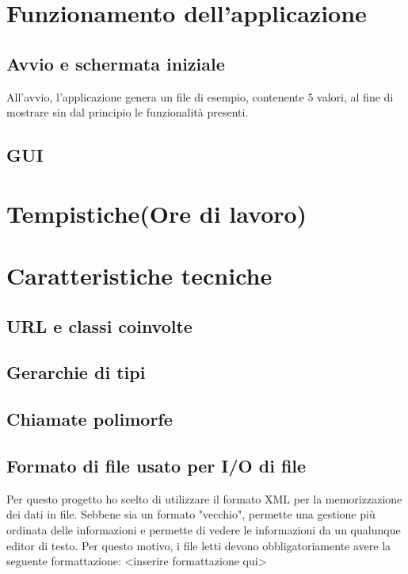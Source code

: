 \documentclass[10pt]{article}
\begin{document}
    \section{Funzionamento dell'applicazione}
    \subsection{Avvio e schermata iniziale}
    All'avvio, l'applicazione genera un file di esempio, contenente 5 valori, al fine di mostrare sin dal principio le funzionalità presenti.
    \subsection{GUI}
    \section{Tempistiche(Ore di lavoro)}
    \section{Caratteristiche tecniche}
    \subsection{URL e classi coinvolte}
    \subsection{Gerarchie di tipi}
    \subsection{Chiamate polimorfe}
    \subsection{Formato di file usato per I/O di file}
    Per questo progetto ho scelto di utilizzare il formato XML per la memorizzazione dei dati in file. Sebbene sia un formato "vecchio", permette una gestione più ordinata delle informazioni e permette di vedere le informazioni da un qualunque editor di testo.
    Per questo motivo, i file letti devono obbligatoriamente avere la seguente formattazione: <inserire formattazione qui>
	
\end{document}
